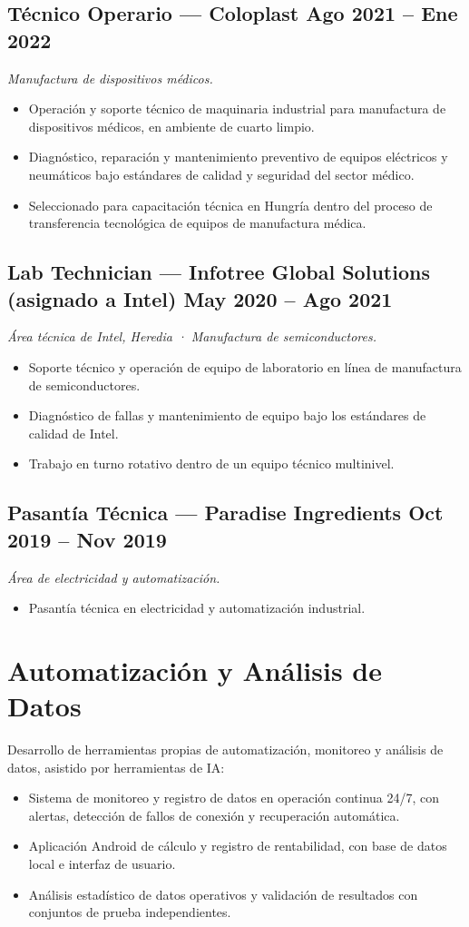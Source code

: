 \documentclass[10.5pt]{article}
\begin{document}
\subsection*{Técnico Operario --- Coloplast \hfill Ago 2021 -- Ene 2022}
\textit{Manufactura de dispositivos médicos.}
\begin{itemize}
\item Operación y soporte técnico de maquinaria industrial para manufactura de dispositivos médicos, en ambiente de cuarto limpio.
\item Diagnóstico, reparación y mantenimiento preventivo de equipos eléctricos y neumáticos bajo estándares de calidad y seguridad del sector médico.
\item Seleccionado para capacitación técnica en Hungría dentro del proceso de transferencia tecnológica de equipos de manufactura médica.
\end{itemize}

\subsection*{Lab Technician --- Infotree Global Solutions (asignado a Intel) \hfill May 2020 -- Ago 2021}
\textit{Área técnica de Intel, Heredia · Manufactura de semiconductores.}
\begin{itemize}
\item Soporte técnico y operación de equipo de laboratorio en línea de manufactura de semiconductores.
\item Diagnóstico de fallas y mantenimiento de equipo bajo los estándares de calidad de Intel.
\item Trabajo en turno rotativo dentro de un equipo técnico multinivel.
\end{itemize}

\subsection*{Pasantía Técnica --- Paradise Ingredients \hfill Oct 2019 -- Nov 2019}
\textit{Área de electricidad y automatización.}
\begin{itemize}
\item Pasantía técnica en electricidad y automatización industrial.
\end{itemize}

\section*{Automatización y Análisis de Datos}
Desarrollo de herramientas propias de automatización, monitoreo y análisis de datos, asistido por herramientas de IA:
\begin{itemize}
\item Sistema de monitoreo y registro de datos en operación continua 24/7, con alertas, detección de fallos de conexión y recuperación automática.
\item Aplicación Android de cálculo y registro de rentabilidad, con base de datos local e interfaz de usuario.
\item Análisis estadístico de datos operativos y validación de resultados con conjuntos de prueba independientes.
\end{itemize}
\end{document}
